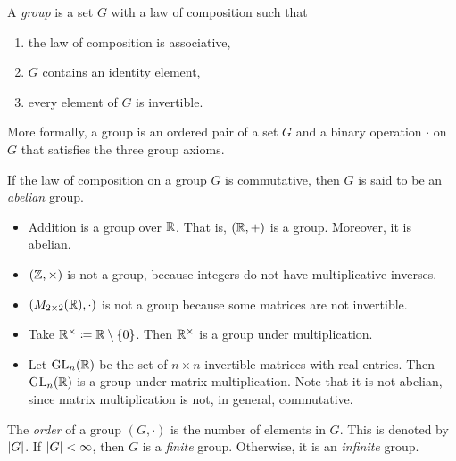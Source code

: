\begin{definition}[Group]
  A \emph{group} is a set $G$ with a law of composition such that 
  \begin{enumerate}
    \item the law of composition is associative,
    \item $G$ contains an identity element,
    \item every element of $G$ is invertible.
  \end{enumerate}
\end{definition}

More formally, a group is an ordered pair of a set $G$ and a binary operation $\cdot$ on $G$ that satisfies the three group axioms.

\begin{definition}
  If the law of composition on a group $G$ is commutative, then $G$ is said to be an \emph{abelian} group.
\end{definition}

\begin{example} \leavevmode
  \begin{itemize}
    \item Addition is a group over $\mathbb{R}$. That is, $(\mathbb{R}, +)$ is a group. Moreover, it is abelian.
    \item $(\mathbb{Z}, \times)$ is not a group, because integers do not have multiplicative inverses.
    \item  $(M_{2\times 2}(\mathbb{R}), \cdot)$ is not a group because some matrices are not invertible.
    \item Take  $\mathbb{R}^{\times} \coloneq \mathbb{R}\setminus \{0\}$. Then $\mathbb{R}^{\times}$ is a group under multiplication.
    \item Let $\operatorname{GL}_n(\mathbb{R})$ be the set of $n\times n$ invertible matrices with real entries. Then $\operatorname{GL}_n(\mathbb{R})$ is a group under matrix multiplication. Note that it is not abelian, since matrix multiplication is not, in general, commutative.
  \end{itemize}
\end{example}

\begin{definition}
  The \emph{order} of a group $(G, \cdot)$ is the number of elements in $G$. This is denoted by $\lvert G\rvert$. If $\lvert G\rvert < \infty$, then $G$ is a \emph{finite} group. Otherwise, it is an \emph{infinite} group.
\end{definition}

